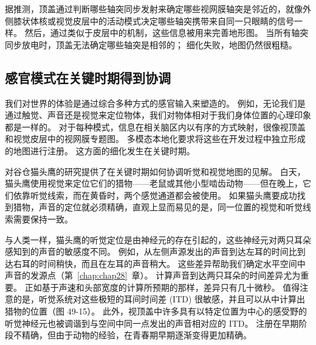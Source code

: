 据推测，顶盖通过判断哪些轴突同步发射来确定哪些视网膜轴突是邻近的，就像外侧膝状体核或视觉皮层中的活动模式决定哪些轴突携带来自同一只眼睛的信号一样。
然后，通过类似于皮层中的机制，这些信息被用来完善地形图。
当所有轴突同步放电时，顶盖无法确定哪些轴突是相邻的；
细化失败，地图仍然很粗糙。



\subsection{感官模式在关键时期得到协调}

我们对世界的体验是通过综合多种方式的感官输入来塑造的。
例如，无论我们是通过触觉、声音还是视觉来定位物体，我们对物体相对于我们身体位置的心理印象都是一样的。
对于每种模式，信息在相关脑区内以有序的方式映射，很像视顶盖和视觉皮层中的视网膜专题图。
多模态本地化要求将这些在开发过程中独立形成的地图进行注册。
这方面的细化发生在关键时期。


对谷仓猫头鹰的研究提供了在关键时期如何协调听觉和视觉地图的见解。
白天，猫头鹰使用视觉来定位它们的猎物——老鼠或其他小型啮齿动物——但在晚上，它们依靠听觉线索，而在黄昏时，两个感觉通道都会被使用。
如果猫头鹰要成功找到猎物，声音的定位就必须精确，直观上显而易见的是，同一位置的视觉和听觉线索需要保持一致。


与人类一样，猫头鹰的听觉定位是由神经元的存在引起的，这些神经元对两只耳朵感知到的声音的敏感度不同。 例如，从左侧声源发出的声音到达左耳的时间比到达右耳的时间稍快，而且在左耳的声音稍大。
这些差异帮助我们确定水平空间中声音的发源点（第~\ref{chap:chap28}~章）。
计算声音到达两只耳朵的时间差异尤为重要。
正如基于声速和头部宽度的计算所预期的那样，差异只有几十微秒。
值得注意的是，听觉系统对这些极短的耳间时间差 (ITD) 很敏感，并且可以从中计算出猎物的位置（图 49-15）。
此外，视顶盖中许多具有以特定位置为中心的感受野的听觉神经元也被调谐到与空间中同一点发出的声音相对应的 ITD。
注册在早期阶段不精确，但由于动物的经验，在青春期早期逐渐变得更加精确。



